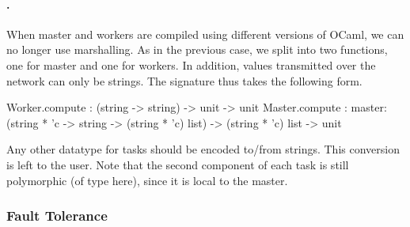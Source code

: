 \documentclass[a4paper,12pt]{article}
\newcommand{\Ocaml}{OCaml}
\begin{document}
\paragraph{.} When master and workers are compiled using
different versions of \Ocaml, we can no longer use marshalling. 
As in the previous case, we split  into two functions, one
for master and one for workers. In addition, values transmitted over
the network can only be strings. The signature thus takes the
following form.
\begin{ocaml}
  Worker.compute : (string -> string) -> unit -> unit
  Master.compute : master:(string * 'c -> string -> (string * 'c) list) -> 
                  (string * 'c) list -> unit
\end{ocaml}
Any other datatype for tasks should be encoded to/from strings. This
conversion is left to the user.
Note that the second component of each task is still polymorphic (of
type  here), since it is local to the master.



\subsubsection{Fault Tolerance}\label{sec:fault}
\end{document}

